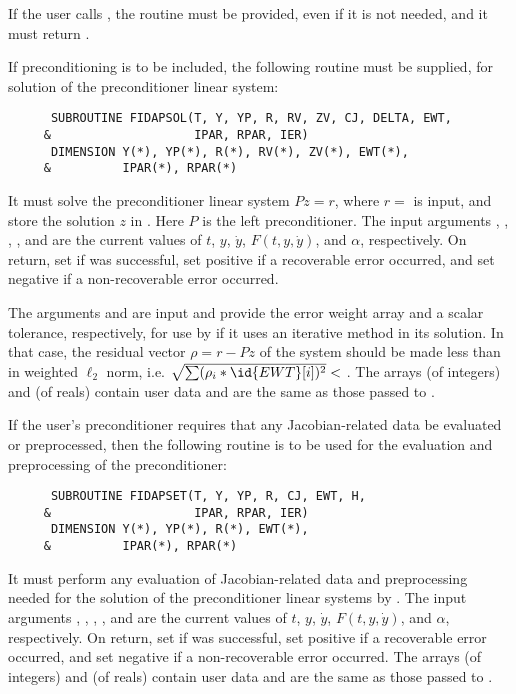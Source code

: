 \begin{Steps}
  {\warn}If the user calls , the routine  must
  be provided, even if it is not needed, and it must return .

  If preconditioning is to be included, the following routine must be
  supplied, for solution of the preconditioner linear system:
\begin{verbatim}
      SUBROUTINE FIDAPSOL(T, Y, YP, R, RV, ZV, CJ, DELTA, EWT,
     &                    IPAR, RPAR, IER)
      DIMENSION Y(*), YP(*), R(*), RV(*), ZV(*), EWT(*),
     &          IPAR(*), RPAR(*)
\end{verbatim}
  It must solve the preconditioner linear system $Pz = r$, where $r =$ 
  is input, and store the solution $z$ in . Here $P$ is the left
  preconditioner.
  The input arguments , , , , and  are the
  current values of $t$, $y$, $\dot{y}$, $F(t,y,\dot{y})$, and $\alpha$, respectively.
  On return, set  if  was successful, set 
  positive if a recoverable error occurred, and set  negative if a
  non-recoverable error occurred.

  The arguments  and  are input and provide the error weight
  array and a scalar tolerance, respectively, for use by  if it uses
  an iterative method in its solution.  In that case, the residual vector
  $\rho = r - Pz$ of the system should be made less than  in weighted
  $\ell_2$ norm, i.e. $\sqrt{\sum(\rho_i * \id{EWT}[i])^2} < $ .
  The arrays  (of integers) and  (of reals) contain user data
  and are the same as those passed to .

  If the user's preconditioner requires that any Jacobian-related data be evaluated
  or preprocessed, then the following routine is to be used for the evaluation and
  preprocessing of the preconditioner:
\begin{verbatim}
      SUBROUTINE FIDAPSET(T, Y, YP, R, CJ, EWT, H,
     &                    IPAR, RPAR, IER)
      DIMENSION Y(*), YP(*), R(*), EWT(*),
     &          IPAR(*), RPAR(*)
\end{verbatim}
  It must perform any evaluation of Jacobian-related data and preprocessing needed
  for the solution of the preconditioner linear systems by .
  The input arguments , , , , and  are the
  current values of $t$, $y$, $\dot{y}$, $F(t,y,\dot{y})$, and $\alpha$, respectively.
  On return, set  if  was successful, set 
  positive if a recoverable error occurred, and set  negative if a
  non-recoverable error occurred.
  The arrays  (of integers) and  (of reals) contain user data
  and are the same as those passed to .


\end{Steps}
